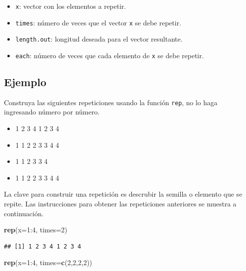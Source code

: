 \documentclass[10pt,]{krantz}
\makeatletter
\newenvironment{Shaded}{\begin{snugshade}}{\end{snugshade}}
\newcommand{\KeywordTok}[1]{\textcolor[rgb]{0.13,0.29,0.53}{\textbf{{#1}}}}
\newcommand{\DataTypeTok}[1]{\textcolor[rgb]{0.13,0.29,0.53}{{#1}}}
\newcommand{\DecValTok}[1]{\textcolor[rgb]{0.00,0.00,0.81}{{#1}}}
\newcommand{\NormalTok}[1]{{#1}}
\providecommand{\tightlist}{%
  \setlength{\itemsep}{0pt}\setlength{\parskip}{0pt}}
\newenvironment{kframe}{%
\medskip{}
\setlength{\fboxsep}{.8em}
 \def\at@end@of@kframe{}%
 \ifinner\ifhmode%
  \def\at@end@of@kframe{\end{minipage}}%
  \begin{minipage}{\columnwidth}%
 \fi\fi%
 \def\FrameCommand##1{\hskip\@totalleftmargin \hskip-\fboxsep
 \colorbox{shadecolor}{##1}\hskip-\fboxsep
     \hskip-\linewidth \hskip-\@totalleftmargin \hskip\columnwidth}%
 \MakeFramed {\advance\hsize-\width
   \@totalleftmargin\z@ \linewidth\hsize
   \@setminipage}}%
 {\par\unskip\endMakeFramed%
 \at@end@of@kframe}
\renewenvironment{Shaded}{\begin{kframe}}{\end{kframe}}
\makeatother
\begin{document}
\begin{itemize}
\tightlist
\item
  \texttt{x}: vector con los elementos a repetir.
\item
  \texttt{times}: número de veces que el vector \texttt{x} se debe
  repetir.
\item
  \texttt{length.out}: longitud deseada para el vector resultante.
\item
  \texttt{each}: número de veces que cada elemento de \texttt{x} se debe
  repetir.
\end{itemize}

\subsection*{Ejemplo}\label{ejemplo-4}


Construya las siguientes repeticiones usando la función \texttt{rep}, no
lo haga ingresando número por número.

\begin{itemize}
\tightlist
\item
  1 2 3 4 1 2 3 4
\item
  1 1 2 2 3 3 4 4
\item
  1 1 2 3 3 4
\item
  1 1 2 2 3 3 4 4
\end{itemize}

La clave para construir una repetición es descrubir la semilla o
elemento que se repite. Las instrucciones para obtener las repeticiones
anteriores se muestra a continuación.

\begin{Shaded}
\begin{Highlighting}[]
\KeywordTok{rep}\NormalTok{(}\DataTypeTok{x=}\DecValTok{1}\NormalTok{:}\DecValTok{4}\NormalTok{, }\DataTypeTok{times=}\DecValTok{2}\NormalTok{)}
\end{Highlighting}
\end{Shaded}

\begin{verbatim}
## [1] 1 2 3 4 1 2 3 4
\end{verbatim}

\begin{Shaded}
\begin{Highlighting}[]
\KeywordTok{rep}\NormalTok{(}\DataTypeTok{x=}\DecValTok{1}\NormalTok{:}\DecValTok{4}\NormalTok{, }\DataTypeTok{times=}\KeywordTok{c}\NormalTok{(}\DecValTok{2}\NormalTok{,}\DecValTok{2}\NormalTok{,}\DecValTok{2}\NormalTok{,}\DecValTok{2}\NormalTok{))}
\end{Highlighting}
\end{Shaded}
\end{document}

